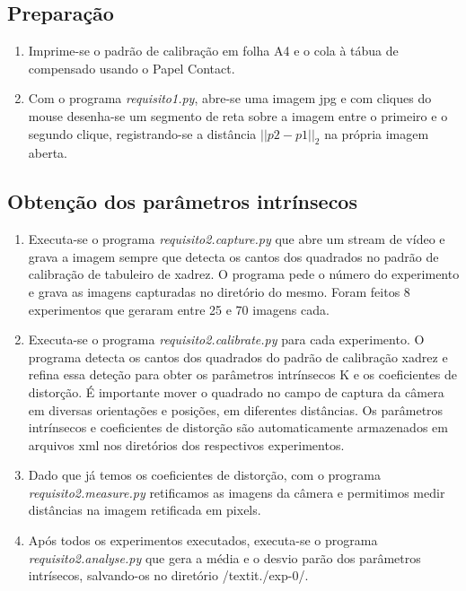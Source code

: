 \documentclass[conference]{IEEEtran}
\begin{document}
\subsection{Preparação}
 \begin{enumerate}
 \item Imprime-se o padrão de calibração em folha A4 e o cola à tábua de compensado usando o Papel Contact.
 \item Com o programa \textit{requisito1.py}, abre-se uma imagem jpg e com cliques do mouse desenha-se um segmento de reta sobre a imagem entre o primeiro e o segundo clique, registrando-se a distância \(||p2 - p1||_2 \) na própria imagem aberta. 
 \end{enumerate}
\subsection{Obtenção dos parâmetros intrínsecos}
 \begin{enumerate}
  \item Executa-se o programa \textit{requisito2.capture.py} que abre um stream de vídeo e grava a imagem sempre que detecta os cantos dos quadrados no padrão de calibração de tabuleiro de xadrez. O programa pede o número do experimento e grava as imagens capturadas no diretório do mesmo.  Foram feitos 8 experimentos que geraram entre 25 e 70 imagens cada.
  \item Executa-se o programa \textit{requisito2.calibrate.py} para cada experimento. O programa detecta os cantos dos quadrados do padrão de calibração xadrez e refina essa deteção para obter os parâmetros intrínsecos K e os coeficientes de distorção. É importante mover o quadrado no campo de captura da câmera em diversas orientações e posições, em diferentes distâncias. Os parâmetros intrínsecos e coeficientes de distorção são automaticamente armazenados em arquivos xml nos diretórios dos respectivos experimentos.
\item Dado que já temos os coeficientes de distorção, com o programa \textit{requisito2.measure.py} retificamos as imagens da câmera e permitimos medir distâncias na imagem retificada em pixels. 
\item Após todos os experimentos executados, executa-se o programa \textit{requisito2.analyse.py} que gera a média e o desvio parão dos parâmetros intrísecos, salvando-os no diretório /textit{./exp-0/}.
\end{enumerate}
\end{document}
